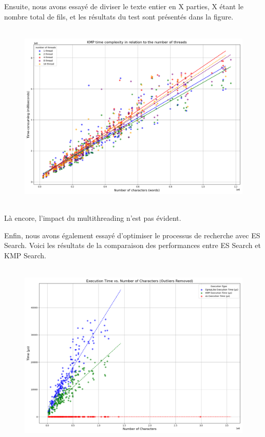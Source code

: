 \documentclass[11pt,english]{article}
\begin{document}
{    \indent Ensuite, nous avons essayé de diviser le texte entier en X parties, X étant le nombre total de fils, et les résultats du test sont présentés dans la figure.

    \begin{figure}[H]
        \begin{center}
            \includegraphics[height=9cm]{./src/KMP_Multi_Part.png}
        \end{center}
    \end{figure}

    \indent Là encore, l'impact du multithreading n'est pas évident.

    \indent Enfin, nous avons également essayé d'optimiser le processus de recherche avec ES Search. Voici les résultats de la comparaison des performances entre ES Search et KMP Search.

    \begin{figure}[H]
        \begin{center}
            \includegraphics[height=9cm]{./src/ES_VS_KMP.png}
        \end{center}
    \end{figure}

}
\end{document}
